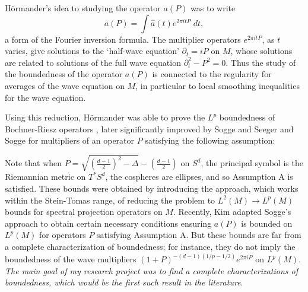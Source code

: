 \documentclass[11pt]{article}
\DeclareMathOperator{\RR}{\mathbb{R}}
\begin{document}
H\"{o}rmander's idea to studying the operator $a(P)$ was to write
%
\[ a(P) = \int \widehat{a}(t) e^{2 \pi i t P}\; dt, \]
%
a form of the Fourier inversion formula. The multiplier operators $e^{2 \pi i t P}$, as $t$ varies, give solutions to the `half-wave equation' $\partial_t = i P$ on $M$, whose solutions are related to solutions of the full wave equation $\partial_t^2 - P^2 = 0$. Thus the study of the boundedness of the operator $a(P)$ is connected to the regularity for averages of the wave equation on $M$, in particular to local smoothing inequalities for the wave equation. %

Using this reduction, H\"{o}rmander was able to prove the $L^p$ boundedness of Bochner-Riesz operators \cite{HormanderRiesz}, later significantly improved by Sogge \cites{SoggeSpherical,SoggeRieszMeans} and Seeger and Sogge \cite{SeegerSoggeBochnerRiesz} for multipliers of an operator $P$ satisfying the following assumption:
%
\begin{center}
\fbox{%
    \parbox{\textwidth - 2em}{%
        {\bf Assumption A}: If $p_{\text{prin}}: T^* M \to [0,\infty)$ is the principal symbol of $P$, then for each $x \in M$ the `cosphere' $S_x^* = \{ \xi \in T^*_x M : p_{\text{prin}}(x,\xi) = 1 \}$ has non-vanishing Gaussian curvature.
    }%
}
\end{center}
%
Note that when $P = \sqrt{ ( {\scriptstyle \frac{d-1}{2} } )^2 - \Delta } - \left( {\scriptstyle \frac{d-1}{2}} \right)$ on $S^d$, the principal symbol is the Riemannian metric on $T^* S^d$, the cospheres are ellipses, and so Assumption A is satisfied. These bounds were obtained by introducing the approach, which works within the Stein-Tomas range, of reducing the problem to $L^2(M) \to L^p(M)$ bounds for spectral projection operators on $M$. Recently, Kim \cite{KimManifold} adapted Sogge's approach to obtain certain necessary conditions ensuring $a(P)$ is bounded on $L^p(M)$ for operators $P$ satisfying Assumption A. But these bounds are far from a complete characterization of boundedness; for instance, they do not imply the boundedness of the wave multipliers $(1 + P)^{-(d-1)(1/p - 1/2)} e^{2 \pi i P}$ on $L^p(M)$. \emph{The main goal of my research project was to find a complete characterizations of boundedness, which would be the first such result in the literature}.
\end{document}
